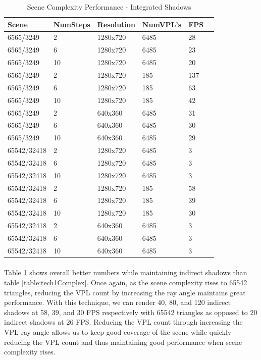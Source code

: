 \begin{table}[h!]
	\caption{Scene Complexity Performance - Integrated Shadows}
	\begin{center}
	    \begin{tabular}{ | l | l | l | l | l | l |}
	    \hline
	    Scene & NumSteps & Resolution & NumVPL's & FPS\\ \hline
	    6565/3249 & 2 & 1280x720 & 6485 & 28\\ \hline
	    6565/3249 & 6 & 1280x720 & 6485 & 23\\ \hline
	    6565/3249 & 10 & 1280x720 & 6485 & 20\\ \hline
	    6565/3249 & 2 & 1280x720 & 185 & 137\\ \hline
	    6565/3249 & 6 & 1280x720 & 185 & 63\\ \hline
	    6565/3249 & 10 & 1280x720 & 185 & 42\\ \hline
	    6565/3249 & 2 & 640x360 & 6485 & 31\\ \hline
	    6565/3249 & 6 & 640x360 & 6485 & 30\\ \hline
	    6565/3249 & 10 & 640x360 & 6485 & 29\\ \hline
	    \hline
	    \hline
	    65542/32418 & 2 & 1280x720 & 6485 & 3\\ \hline
	    65542/32418 & 6 & 1280x720 & 6485 & 3\\ \hline
	    65542/32418 & 10 & 1280x720 & 6485 & 3\\ \hline
	    65542/32418 & 2 & 1280x720 & 185 & 58\\ \hline
	    65542/32418 & 6 & 1280x720 & 185 & 39\\ \hline
	    65542/32418 & 10 & 1280x720 & 185 & 30\\ \hline
	    65542/32418 & 2 & 640x360 & 6485 & 3\\ \hline
	    65542/32418 & 6 & 640x360 & 6485 & 3\\ \hline
	    65542/32418 & 10 & 640x360 & 6485 & 3\\ \hline
	    \end{tabular}
	\end{center}
	\label{table:tech2Complex}
\end{table}

\paragraph{}
Table \ref{table:tech2Complex} shows overall better numbers while maintaining indirect shadows than table \ref{table:tech1Complex}.  Once again, as the scene complexity rises to 65542 triangles, reducing the VPL count by increasing the ray angle maintains great performance.  With this technique, we can render 40, 80, and 120 indirect shadows at 58, 39, and 30 FPS respectively with 65542 triangles as opposed to 20 indirect shadows at 26 FPS.  Reducing the VPL count through increasing the VPL ray angle allows us to keep good coverage of the scene while quickly reducing the VPL count and thus maintaining good performance when scene complexity rises.

